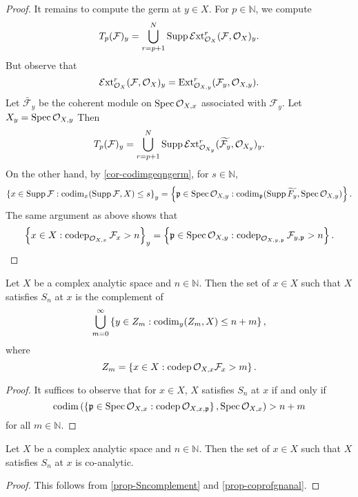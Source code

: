 \begin{proof}
    It remains to compute the germ at $y\in X$. For $p\in \mathbb{N}$, we compute
    \[
        T_p(\mathcal{F})_y=  \bigcup_{r=p+1}^{N}\operatorname{Supp} \mathcal{E}\mathrm{xt}_{\mathcal{O}_X}^r(\mathcal{F},\mathcal{O}_X)_y.
    \]
    But observe that
    \[
        \mathcal{E}\mathrm{xt}_{\mathcal{O}_X}^r(\mathcal{F},\mathcal{O}_X)_y=\operatorname{Ext}_{\mathcal{O}_{X,y}}^r(\mathcal{F}_y,\mathcal{O}_{X,y}).
    \]
    Let $\widetilde{\mathcal{F}_y}$ be the coherent module on $\operatorname{Spec} \mathcal{O}_{X,x}$ associated with $\mathcal{F}_y$. Let $X_y=\operatorname{Spec} \mathcal{O}_{X,y}$
    Then 
    \[
        T_p(\mathcal{F})_y=\bigcup_{r=p+1}^{N} \operatorname{Supp} \mathcal{E}\mathrm{xt}_{\mathcal{O}_{X_y}}^r(\widetilde{\mathcal{F}_y},\mathcal{O}_{X_y})_y.
    \]
    On the other hand, by \cref{cor-codimgeqngerm}, for $s\in \mathbb{N}$,
    \[
        \left\{x\in \operatorname{Supp} \mathcal{F}:\operatorname{codim}_x(\operatorname{Supp} \mathcal{F},X)\leq s\right\}_y=  \left\{ \mathfrak{p}\in \operatorname{Spec} \mathcal{O}_{X,y}: \operatorname{codim}_{\mathfrak{p}}(\operatorname{Supp} \widetilde{F_y},\operatorname{Spec} \mathcal{O}_{X,y}) \right\}.
    \]
    The same argument as above shows that 
    \[
        \left\{x\in X: \operatorname{codep}_{\mathcal{O}_{X,x}}\mathcal{F}_x> n \right\}_y=\left\{\mathfrak{p}\in \operatorname{Spec} \mathcal{O}_{X,y}: \operatorname{codep}_{\mathcal{O}_{X,y,\mathfrak{p}}}\mathcal{F}_{y,\mathfrak{p}}> n \right\}. 
    \]
\end{proof}

\begin{proposition}\label{prop-Sncomplement}
    Let $X$ be a complex analytic space and $n\in \mathbb{N}$. Then the set of $x\in X$ such that $X$ satisfies $S_n$ at $x$ is the complement of 
    \[
        \bigcup_{m=0}^{\infty}\left\{ y\in Z_m :\operatorname{codim}_y(Z_m,X)\leq n+m \right\},  
    \]
    where 
    \[
        Z_m= \left\{x\in X: \operatorname{codep} \mathcal{O}_{X,x}\mathcal{F}_x> m \right\}.
    \]
\end{proposition}
\begin{proof}
    It suffices to observe that for $x\in X$, $X$ satisfies $S_n$ at $x$ if and only if
    \[
        \operatorname{codim} \left(\left\{ \mathfrak{p}\in \operatorname{Spec} \mathcal{O}_{X,x}: \operatorname{codep} \mathcal{O}_{X,x,\mathfrak{p}} \right\} ,\operatorname{Spec} \mathcal{O}_{X,x}\right)>n+m  
    \]
    for all $m\in \mathbb{N}$.
\end{proof}

\begin{corollary}\label{cor-Snlocuscoana}
    Let $X$ be a complex analytic space and $n\in \mathbb{N}$. Then the set of $x\in X$ such that $X$ satisfies $S_n$ at $x$ is co-analytic.
\end{corollary}
\begin{proof}
    This follows from \cref{prop-Sncomplement} and \cref{prop-coprofgnanal}.
\end{proof}

